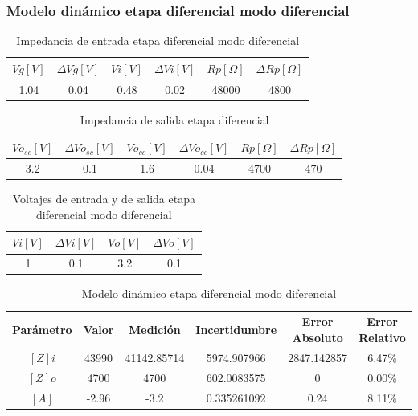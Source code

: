 \subsubsection{Modelo dinámico etapa diferencial modo diferencial}

\begin{table}[h!]
\centering
\begin{tabular}{|c|c|c|c|c|c|}
\hline
\textbf{\(Vg[V]\)} & \textbf{\(\varDelta Vg[V]\)} & \textbf{\(Vi[V]\)} & \textbf{\(\varDelta Vi[V]\)} & \textbf{\(Rp[\Omega]\)} & \textbf{\(\varDelta Rp[\Omega]\)} \\ \hline
1.04 & 0.04 & 0.48 & 0.02 & 48000 & 4800 \\ \hline
\end{tabular}
\caption{Impedancia de entrada etapa diferencial modo diferencial}
\label{tab:med-impedancia-entrada-etapa-diferencial modo diferencial}
\end{table}

\begin{table}[h!]
\centering
\begin{tabular}{|c|c|c|c|c|c|}
\hline
\textbf{\(Vo_{sc}[V]\)} & \textbf{\(\varDelta Vo_{sc}[V]\)} & \textbf{\(Vo_{cc}[V]\)} & \textbf{\(\varDelta Vo_{cc}[V]\)} & \textbf{\(Rp[\Omega]\)} & \textbf{\(\varDelta Rp[\Omega]\)} \\ \hline
3.2 & 0.1 & 1.6 & 0.04 & 4700 & 470 \\ \hline
\end{tabular}
\caption{Impedancia de salida etapa diferencial}
\label{tab:med-impedancia-entrada-etapa-diferencial}
\end{table}

\begin{table}[h!]
\centering
\begin{tabular}{|c|c|c|c|}
\hline
\textbf{\(Vi[V]\)} & \textbf{\(\varDelta Vi[V]\)} & \textbf{\(Vo[V]\)} & \textbf{\(\varDelta Vo[V]\)} \\ \hline
1 & 0.1 & 3.2 & 0.1 \\ \hline
\end{tabular}
\caption{Voltajes de entrada y de salida etapa diferencial modo diferencial}
\label{tab:med-voltaje-entrada-salida-etapa-diferencial}
\end{table}

\begin{table}[h!]
\centering
\begin{tabular}{|c|c|c|c|c|c|}
\hline
\textbf{Parámetro} & \textbf{Valor} & \textbf{Medición} & \textbf{Incertidumbre} & \textbf{Error Absoluto} & \textbf{Error Relativo} \\ \hline
$[Z] i$ & 43990 & 41142.85714 & 5974.907966 & 2847.142857 & 6.47\% \\ \hline
$[Z] o$ & 4700 & 4700 & 602.0083575 & 0 & 0.00\% \\ \hline
$[A]$ & -2.96 & -3.2 & 0.335261092 & 0.24 & 8.11\% \\ \hline
\end{tabular}
\caption{Modelo dinámico etapa diferencial modo diferencial}
\label{tab:med-modelo-dinamico-etapa-diferencial-modo-diferencial}
\end{table}

